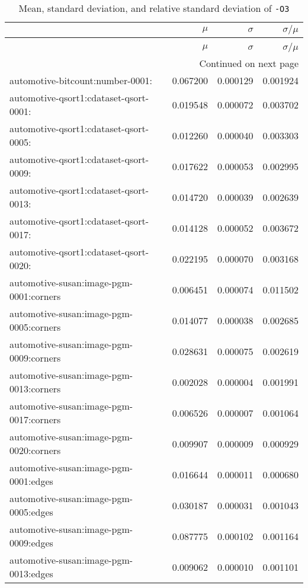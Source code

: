 \begin{longtable}{lrrr}
\caption{Mean, standard deviation, and relative standard deviation of \texttt{-O3}} \label{table:default-relative-standard-deviation} \\
\toprule
 & $\mu$ & $\sigma$ & $\sigma / \mu$ \\
\midrule
\endfirsthead
\caption[]{Mean, standard deviation, and relative standard deviation of \texttt{-O3}} \\
\toprule
 & $\mu$ & $\sigma$ & $\sigma / \mu$ \\
\midrule
\endhead
\midrule
\multicolumn{4}{r}{Continued on next page} \\
\midrule
\endfoot
\bottomrule
\endlastfoot
automotive-bitcount:number-0001: & 0.067200 & 0.000129 & 0.001924 \\
automotive-qsort1:cdataset-qsort-0001: & 0.019548 & 0.000072 & 0.003702 \\
automotive-qsort1:cdataset-qsort-0005: & 0.012260 & 0.000040 & 0.003303 \\
automotive-qsort1:cdataset-qsort-0009: & 0.017622 & 0.000053 & 0.002995 \\
automotive-qsort1:cdataset-qsort-0013: & 0.014720 & 0.000039 & 0.002639 \\
automotive-qsort1:cdataset-qsort-0017: & 0.014128 & 0.000052 & 0.003672 \\
automotive-qsort1:cdataset-qsort-0020: & 0.022195 & 0.000070 & 0.003168 \\
automotive-susan:image-pgm-0001:corners & 0.006451 & 0.000074 & 0.011502 \\
automotive-susan:image-pgm-0005:corners & 0.014077 & 0.000038 & 0.002685 \\
automotive-susan:image-pgm-0009:corners & 0.028631 & 0.000075 & 0.002619 \\
automotive-susan:image-pgm-0013:corners & 0.002028 & 0.000004 & 0.001991 \\
automotive-susan:image-pgm-0017:corners & 0.006526 & 0.000007 & 0.001064 \\
automotive-susan:image-pgm-0020:corners & 0.009907 & 0.000009 & 0.000929 \\
automotive-susan:image-pgm-0001:edges & 0.016644 & 0.000011 & 0.000680 \\
automotive-susan:image-pgm-0005:edges & 0.030187 & 0.000031 & 0.001043 \\
automotive-susan:image-pgm-0009:edges & 0.087775 & 0.000102 & 0.001164 \\
automotive-susan:image-pgm-0013:edges & 0.009062 & 0.000010 & 0.001101 \\

\end{longtable}
